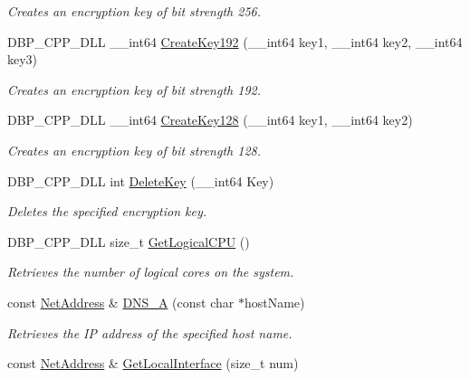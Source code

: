 \begin{DoxyCompactItemize}
\begin{DoxyCompactList}\small\item\em Creates an encryption key of bit strength 256. \item\end{DoxyCompactList}\item 
DBP\_\-CPP\_\-DLL \_\-\_\-int64 \hyperlink{namespacemn_ad552576288521cb5b06a62a475979019}{CreateKey192} (\_\-\_\-int64 key1, \_\-\_\-int64 key2, \_\-\_\-int64 key3)
\begin{DoxyCompactList}\small\item\em Creates an encryption key of bit strength 192. \item\end{DoxyCompactList}\item 
DBP\_\-CPP\_\-DLL \_\-\_\-int64 \hyperlink{namespacemn_aa7965082be8c8c750040b600b4983751}{CreateKey128} (\_\-\_\-int64 key1, \_\-\_\-int64 key2)
\begin{DoxyCompactList}\small\item\em Creates an encryption key of bit strength 128. \item\end{DoxyCompactList}\item 
DBP\_\-CPP\_\-DLL int \hyperlink{namespacemn_acb38ba4db45ea37eb762d9fe22045025}{DeleteKey} (\_\-\_\-int64 Key)
\begin{DoxyCompactList}\small\item\em Deletes the specified encryption key. \item\end{DoxyCompactList}\item 
DBP\_\-CPP\_\-DLL size\_\-t \hyperlink{namespacemn_acaad9f6d77fe2ebd20db513978949fc7}{GetLogicalCPU} ()
\begin{DoxyCompactList}\small\item\em Retrieves the number of logical cores on the system. \item\end{DoxyCompactList}\item 
const \hyperlink{class_net_address}{NetAddress} \& \hyperlink{namespacemn_a03e4a7849d9aa386ca0e139367d5c36f}{DNS\_\-A} (const char $\ast$hostName)
\begin{DoxyCompactList}\small\item\em Retrieves the IP address of the specified host name. \item\end{DoxyCompactList}\item 
const \hyperlink{class_net_address}{NetAddress} \& \hyperlink{namespacemn_a629161ab269f8c863a3177abba2a3055}{GetLocalInterface} (size\_\-t num)

\end{DoxyCompactItemize}
